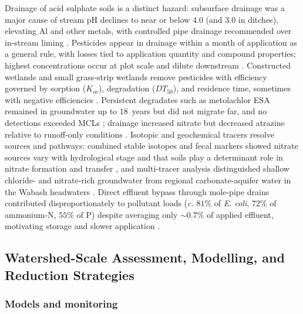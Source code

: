 Drainage of acid sulphate soils is a distinct hazard: subsurface drainage
was a major cause of stream pH declines to near or below $4.0$ (and $3.0$
in ditches), elevating Al and other metals, with controlled pipe drainage
recommended over in-stream liming \parencite{Osterholm2005,Åström2005}.
Pesticides appear in drainage within a month of application as a general
rule, with losses tied to application quantity and compound properties;
highest concentrations occur at plot scale and dilute downstream
\parencite{Tournebize2012}. Constructed wetlands and small grass-strip
wetlands remove pesticides with efficiency governed by sorption ($K_{oc}$),
degradation ($DT_{50}$), and residence time, sometimes with negative
efficiencies \parencite{Tournebize2017,Vallée2015}. Persistent degradates
such as metolachlor ESA remained in groundwater up to $18$~years but did
not migrate far, and no detections exceeded MCLs \parencite{Puckett2005};
drainage increased nitrate but decreased atrazine relative to runoff-only
conditions \parencite{SPALING1995}. Isotopic and geochemical tracers
resolve sources and pathways: combined stable isotopes and fecal markers
showed nitrate sources vary with hydrological stage and that soils play a
determinant role in nitrate formation and transfer \parencite{Briand2017},
and multi-tracer analysis distinguished shallow chloride- and nitrate-rich
groundwater from regional carbonate-aquifer water in the Wabash headwaters
\parencite{Frisbee2022}. Direct effluent bypass through mole-pipe drains
contributed disproportionately to pollutant loads (\emph{c.} $81\%$ of
\emph{E. coli}, $72\%$ of ammonium-N, $55\%$ of P) despite averaging only
$\sim0.7\%$ of applied effluent, motivating storage and slower application
\parencite{Monaghan2004,Monaghan2007}.

\subsection{Watershed-Scale Assessment, Modelling, and Reduction Strategies}

\subsubsection{Models and monitoring}

